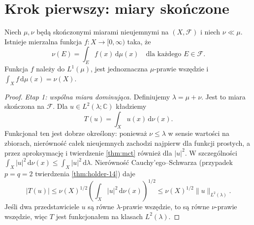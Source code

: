 \section{Krok pierwszy: miary skończone}
\begin{twierdzenie}
\label{thm:RN-finite-18}
Niech $\mu,\nu$ będą skończonymi miarami nieujemnymi
na $(X,\mathcal F)$ i niech $\nu\ll\mu$.
Istnieje mierzalna funkcja $f:X\to[0,\infty)$ taka, że
\begin{equation}\label{eq:RN-finite-18}
\nu(E)=\int_E f(x)\,\mathrm d\mu(x)
\quad\text{dla każdego }E\in\mathcal F.
\end{equation}
Funkcja $f$ należy do $L^1(\mu)$, jest jednoznaczna
$\mu$-prawie wszędzie i
$\int_Xf\,\mathrm d\mu(x)=\nu(X)$.
\end{twierdzenie}
\begin{proof}
\emph{Etap 1: wspólna miara dominująca.}
Definiujemy $\lambda=\mu+\nu$. Jest to miara skończona
na $\mathcal F$. Dla $u\in L^2(\lambda;\mathbb C)$
kładziemy
\[
T(u)=\int_X u(x)\,\mathrm d\nu(x).
\]
Funkcjonał ten jest dobrze określony: ponieważ
$\nu\le\lambda$ w sensie wartości na zbiorach,
nierówność całek nieujemnych zachodzi najpierw dla
funkcji prostych, a przez aproksymację i twierdzenie
\ref{thm:mct} również dla $|u|^2$. W szczególności
$\int_X|u|^2\,\mathrm d\nu(x)\le
\int_X|u|^2\,\mathrm d\lambda$.
Nierówność Cauchy'ego--Schwarza (przypadek $p=q=2$
twierdzenia \ref{thm:holder-14}) daje
\[
|T(u)|\le\nu(X)^{1/2}
\left(\int_X|u|^2\,\mathrm d\nu(x)\right)^{1/2}
\le\nu(X)^{1/2}\|u\|_{L^2(\lambda)}.
\]
Jeśli dwa przedstawiciele $u$ są równe $\lambda$-prawie
wszędzie, to są równe $\nu$-prawie wszędzie, więc
$T$ jest funkcjonałem na klasach $L^2(\lambda)$.


\end{proof}
